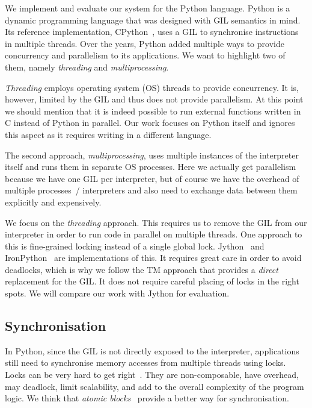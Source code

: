 \documentclass{sigplanconf}
\begin{document}
We implement and evaluate our system for the Python language. Python
is a dynamic programming language that was designed with GIL semantics
in mind. Its reference implementation, CPython~\cite{cpython}, uses a
GIL to synchronise instructions in multiple threads.
Over the years, Python added multiple ways to provide concurrency and
parallelism to its applications. We want to highlight two of them,
namely \emph{threading} and \emph{multiprocessing}.

\emph{Threading} employs operating system (OS) threads to provide
concurrency. It is, however, limited by the GIL and thus does not
provide parallelism. At this point we should mention that it is indeed
possible to run external functions written in C instead of Python in
parallel. Our work focuses on Python itself and ignores this aspect as
it requires writing in a different language.

The second approach, \emph{multiprocessing}, uses multiple instances
of the interpreter itself and runs them in separate OS processes.
Here we actually get parallelism because we have one GIL per
interpreter, but of course we have the overhead of multiple processes~/
interpreters and also need to exchange data between them explicitly
and expensively.

We focus on the \emph{threading} approach. This requires us to remove
the GIL from our interpreter in order to run code in parallel on
multiple threads. One approach to this is fine-grained locking instead
of a single global lock. Jython~\cite{webjython} and
IronPython~\cite{ironpython} are implementations of this. It requires
great care in order to avoid deadlocks, which is why we follow the TM
approach that provides a \emph{direct} replacement for the GIL. It
does not require careful placing of locks in the right spots. We will
compare our work with Jython for evaluation.


\subsection{Synchronisation}

In Python, since the GIL is not directly exposed to the interpreter,
applications still need to synchronise memory accesses from multiple
threads using locks. Locks can be very hard to get
right~\cite{christopher10,victor11,shan08}.  They are non-composable,
have overhead, may deadlock, limit scalability, and add to the overall
complexity of the program logic. We think that \emph{atomic
blocks}~\cite{tim03,tim05} provide a better way for synchronisation.
\end{document}

